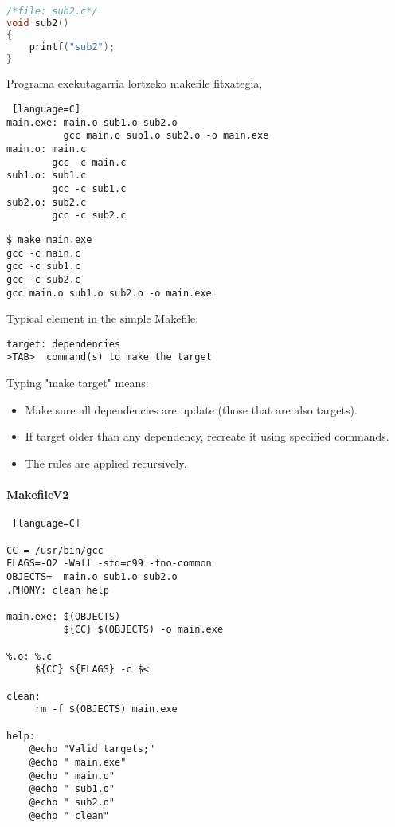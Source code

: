 \begin{lstlisting}[language=C]
/*file: sub2.c*/
void sub2()
{
    printf("sub2");
}
\end{lstlisting}

Programa exekutagarria lortzeko makefile fitxategia,

\begin{lstlisting} [language=C]
main.exe: main.o sub1.o sub2.o
	      gcc main.o sub1.o sub2.o -o main.exe
main.o: main.c
        gcc -c main.c
sub1.o: sub1.c
        gcc -c sub1.c        
sub2.o: sub2.c
        gcc -c sub2.c        
\end{lstlisting}

\begin{lstlisting}
$ make main.exe
gcc -c main.c
gcc -c sub1.c
gcc -c sub2.c
gcc main.o sub1.o sub2.o -o main.exe
\end{lstlisting}

Typical element in the simple Makefile:

\begin{lstlisting}
target: dependencies
>TAB>  command(s) to make the target
\end{lstlisting}

Typing "make target" means:
\begin{itemize}
\item Make sure all dependencies are update (those that are also targets).
\item If target older than any dependency, recreate it using specified commands.
\item The rules are applied recursively.
\end{itemize}

\paragraph*{\textbf{MakefileV2}}

\begin{lstlisting} [language=C]

CC = /usr/bin/gcc
FLAGS=-O2 -Wall -std=c99 -fno-common 
OBJECTS=  main.o sub1.o sub2.o
.PHONY: clean help

main.exe: $(OBJECTS)
	      ${CC} $(OBJECTS) -o main.exe
	      
%.o: %.c
     ${CC} ${FLAGS} -c $<	      
	      
clean:
     rm -f $(OBJECTS) main.exe

help:
    @echo "Valid targets;"
    @echo " main.exe"
    @echo " main.o"
    @echo " sub1.o"
    @echo " sub2.o"
    @echo " clean"
             
\end{lstlisting}


